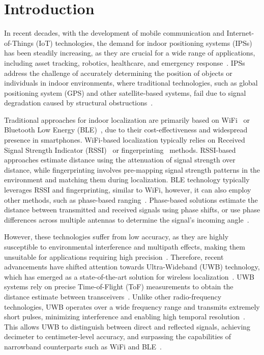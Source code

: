 \chapter{Introduction}

In recent decades, with the development of mobile communication and Internet-of-Things (IoT) technologies, the demand for indoor positioning systems (IPSs) has been steadily increasing, as they are crucial for a wide range of applications, including asset tracking, robotics, healthcare, and emergency response~\cite{indoor2022Farahsari}. IPSs address the challenge of accurately determining the position of objects or individuals in indoor environments, where traditional technologies, such as global positioning system (GPS) and other satellite-based systems, fail due to signal degradation caused by structural obstructions~\cite{alarifi2016ultra}.

Traditional approaches for indoor localization are primarily based on WiFi~\cite{Abbas2019Wifi} or Bluetooth Low Energy (BLE)~\cite{Jianyong2014BLE_RSSI}, due to their cost-effectiveness and widespread presence in smartphones. WiFi-based localization typically relies on Received Signal Strength Indicator (RSSI)~\cite{Palumbo2015RSS} or fingerprinting~\cite{Pelant2017RSSFinger} methods. RSSI-based approaches estimate distance using the attenuation of signal strength over distance, while fingerprinting involves pre-mapping signal strength patterns in the environment and matching them during localization. BLE technology typically leverages RSSI and fingerprinting, similar to WiFi, however, it can also employ other methods, such as phase-based ranging~\cite{Zand2019PhaseBLE}. Phase-based solutions estimate the distance between transmitted and received signals using phase shifts, or use phase differences across multiple antennas to determine the signal's incoming angle~\cite{Dyhdalovych2025BLE}.

However, these technologies suffer from low accuracy, as they are highly susceptible to environmental interference and multipath effects, making them unsuitable for applications requiring high precision~\cite{Yang2021LOC, Zand2019PhaseBLE, Ahmed2024BLE}. Therefore, recent advancements have shifted attention towards Ultra-Wideband (UWB) technology, which has emerged as a state-of-the-art solution for wireless localization~\cite{Simone2021UWB}. UWB systems rely on precise Time-of-Flight (ToF) measurements to obtain the distance estimate between transceivers~\cite{Qu_2023}. Unlike other radio-frequency technologies, UWB operates over a wide frequency range and transmits extremely short pulses, minimizing interference and enabling high temporal resolution~\cite{Che2022UWB}. This allows UWB to distinguish between direct and reflected signals, achieving decimeter to centimeter-level accuracy, and surpassing the capabilities of narrowband counterparts such as WiFi and BLE~\cite{Wang2023NLoS, Khan2022UWB}. 

